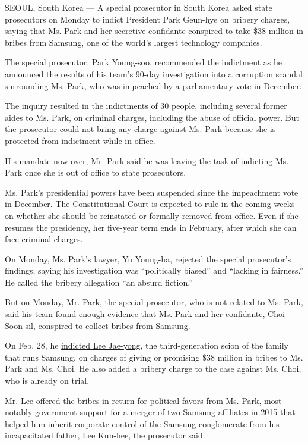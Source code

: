 SEOUL, South Korea --- A special prosecutor in South Korea asked state
prosecutors on Monday to indict President Park Geun-hye on bribery
charges, saying that Ms. Park and her secretive confidante conspired to
take \$38 million in bribes from Samsung, one of the world's largest
technology companies.

The special prosecutor, Park Young-soo, recommended the indictment as he
announced the results of his team's 90-day investigation into a
corruption scandal surrounding Ms. Park, who was
\href{https://www.nytimes.com/2016/12/09/world/asia/south-korea-president-park-geun-hye-impeached.html}{impeached
by a parliamentary vote} in December.

The inquiry resulted in the indictments of 30 people, including several
former aides to Ms. Park, on criminal charges, including the abuse of
official power. But the prosecutor could not bring any charge against
Ms. Park because she is protected from indictment while in office.

His mandate now over, Mr. Park said he was leaving the task of indicting
Ms. Park once she is out of office to state prosecutors.

Ms. Park's presidential powers have been suspended since the impeachment
vote in December. The Constitutional Court is expected to rule in the
coming weeks on whether she should be reinstated or formally removed
from office. Even if she resumes the presidency, her five-year term ends
in February, after which she can face criminal charges.

On Monday, Ms. Park's lawyer, Yu Young-ha, rejected the special
prosecutor's findings, saying his investigation was ``politically
biased'' and ``lacking in fairness.'' He called the bribery allegation
``an absurd fiction.''

But on Monday, Mr. Park, the special prosecutor, who is not related to
Ms. Park, said his team found enough evidence that Ms. Park and her
confidante, Choi Soon-sil, conspired to collect bribes from Samsung.

On Feb. 28, he
\href{https://www.nytimes.com/2017/02/28/world/asia/lee-jae-yong-samsung.html}{indicted
Lee Jae-yong}, the third-generation scion of the family that runs
Samsung, on charges of giving or promising \$38 million in bribes to Ms.
Park and Ms. Choi. He also added a bribery charge to the case against
Ms. Choi, who is already on trial.

Mr. Lee offered the bribes in return for political favors from Ms. Park,
most notably government support for a merger of two Samsung affiliates
in 2015 that helped him inherit corporate control of the Samsung
conglomerate from his incapacitated father, Lee Kun-hee, the prosecutor
said.

